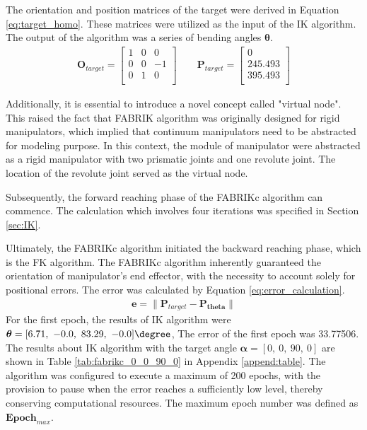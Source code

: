 The orientation and position matrices of the target were derived in Equation 
\ref{eq:target_homo}. These matrices were utilized as the input of the IK algorithm. The output of the algorithm 
was a series of bending angles $\boldsymbol{\theta}$.
\vspace{-5mm}
\begin{align}
    \textbf{O}_{target} = 
    \begin{bmatrix}
        1 & 0 & 0 \\
        0 & 0 & -1 \\
        0 & 1 & 0 \\
    \end{bmatrix} 
    \qquad
    \textbf{P}_{target} = 
    \begin{bmatrix}
        0 \\
        245.493 \\
        395.493 \\
    \end{bmatrix} 
    \label{eq:target_homo} 
\end{align}

Additionally, it is essential to introduce a novel concept called "virtual node". This raised the fact that FABRIK 
algorithm was originally designed for rigid manipulators, which implied that continuum manipulators need to be abstracted 
for modeling purpose. In this context, the module of manipulator were abstracted as a rigid manipulator with two prismatic 
joints and one revolute joint. The location of the revolute joint served as the virtual node. 

Subsequently, the forward reaching phase of the FABRIKc algorithm can commence. The calculation which involves four 
iterations was specified in Section \ref{sec:IK}.

Ultimately, the FABRIKc algorithm initiated the backward reaching phase, which is the FK algorithm. The 
FABRIKc algorithm inherently guaranteed the orientation of manipulator's end effector,  with the necessity to account 
solely for positional errors. The error was calculated by Equation \ref{eq:error_calculation}.
\vspace{-5mm}
\begin{align}
    \textbf{e} = \lVert\textbf{P}_{target} - \textbf{P}_{\boldsymbol{theta}}\rVert
    \label{eq:error_calculation}
\end{align}
For the first epoch, the results of IK algorithm were
$\boldsymbol{\theta} = [6.71,\ -0.0,\ 83.29,\ -0.0]\degree $, 
The error of the first epoch was 33.77506. The results about IK algorithm with the target angle 
$\boldsymbol{\alpha} = [0,\ 0,\ 90,\ 0] $ are shown in Table \ref{tab:fabrikc_0_0_90_0} 
in Appendix \ref{append:table}. The algorithm was configured to execute a maximum of 200 epochs, with 
the provision to pause when the error reaches a sufficiently low level, thereby conserving computational resources. 
The maximum epoch number was defined as ${\textbf{Epoch}}_{max}$.

